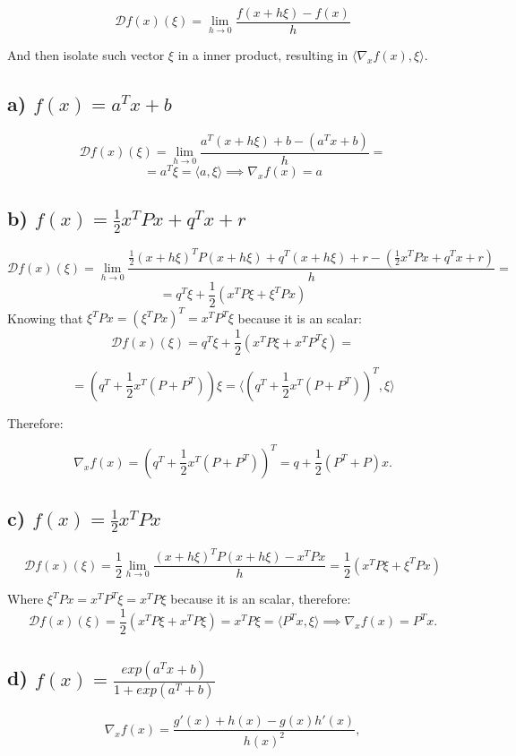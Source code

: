 \documentclass[a4paper]{article}
\begin{document}
$$
\mathcal{D}f(x)(\xi) = \lim_{h \to 0} \frac{f(x + h \xi) - f(x)}{h}
$$

And then isolate such vector $\xi$ in a inner product, resulting in $\langle \nabla_xf(x), \xi \rangle$.

\subsection{a) $f(x) = a^T x + b$}
$$
\mathcal{D}f(x)(\xi) = \lim_{h \to 0} \frac{a^T (x + h \xi) + b - (a^T x + b)}{h} =
$$
$$
= a^T \xi = \langle a, \xi \rangle \implies \nabla_xf(x) = a
$$

\subsection{b) $f(x) = \frac{1}{2} x^T P x + q^T x + r$}
$$
\mathcal{D}f(x)(\xi) = \lim_{h \to 0} \frac{ \frac{1}{2}  (x + h \xi)^T P (x + h \xi) + q^T (x + h \xi) + r - ( \frac{1}{2} x^T P x + q^T x + r)}{h} =
$$
$$
= q^T \xi + \frac{1}{2} (x^T P \xi + \xi^T P x)
$$
Knowing that $\xi^T P x = (\xi^T P x) ^ T = x^T P^T \xi$ because it is an scalar:
$$
\mathcal{D}f(x)(\xi) = q^T \xi + \frac{1}{2} (x^T P \xi + x^T P^T \xi) =
$$

$$
= (q^T + \frac{1}{2} x ^ T (P + P^T)) \xi = \langle (q^T + \frac{1}{2} x ^ T (P + P^T))^T, \xi \rangle
$$

Therefore:

$$
\nabla_x f(x) = (q^T + \frac{1}{2} x ^ T (P + P^T))^T = q + \frac{1}{2} (P^T + P) x.
$$

\subsection{c) $f(x) = \frac{1}{2} x^T P x$}
$$
\mathcal{D}f(x)(\xi) = \frac{1}{2} \lim_{h \to 0} \frac{(x + h \xi)^T P (x + h \xi) - x^T P x}{h} = \frac{1}{2} (x^T P \xi + \xi ^ T P x)
$$

Where $\xi ^ T P x = x^T P^T \xi = x^T P \xi$ because it is an scalar, therefore:
$$
\mathcal{D}f(x)(\xi) = \frac{1}{2} (x^T P \xi + x^T P \xi) = x^T P \xi = \langle P^T x, \xi \rangle \implies \nabla_x f(x) = P^T x.
$$

\subsection{d) $f(x) = \frac{exp(a^T x + b)}{1 + exp(a^T + b)}$}
$$
\nabla_x f(x) = \frac{g'(x) + h(x) - g(x) h'(x)}{h(x) ^ 2},
$$
\end{document}
